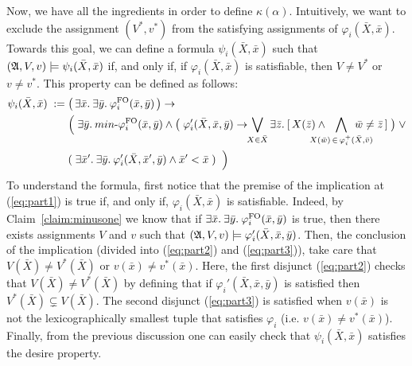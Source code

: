 Now, we have all the ingredients in order to define $\kappa(\alpha)$. 
Intuitively, we want to exclude the assignment $(V^*, v^*)$ from the satisfying assignments of $\varphi_i(\bar{X},\bar{x})$.
Towards this goal, we can define a formula $\psi_i(\bar{X},\bar{x})$ such that $(\mathfrak{A}, V, v) \models \psi_i(\bar{X},\bar{x})$ if, and only if, if $\varphi_i(\bar{X}, \bar{x})$ is satisfiable, then
$V \neq V^*$ or $v \neq v^*$. 
This property can be defined as follows:
\begin{align}
\psi_i(\bar{X},\bar{x}) \; := \;  &\big( \, \ex{\bar{x}} \ex{\bar{y}} \varphi^{\fo}_i(\bar{x},\bar{y}) \,\big) \rightarrow  \label{eq:part1} \\
&\Big( \; 
\ex{\bar{y}} \text{$min$-}\varphi^{\fo}_i(\bar{x}, \bar{y}) \wedge \big( \; \varphi_i'(\bar{X},\bar{x}, \bar{y})  \rightarrow \!\! \bigvee_{X \in \bar{X}} \ex{\bar{z}} [ \, X(\bar{z}) \wedge   \!\!\!\!\!\!\!\!\!\! \bigwedge\limits_{X(\bar{w}) \, \in \, \varphi^{+}_i(\bar{X},\bar{v})} \!\!\!\!\!\!\!\!\!\!\! \bar{w}\neq\bar{z} \, ] \; \big) \;  \vee   \label{eq:part2} \\ 
&(\; \ex{\bar{x}'} \ex{\bar{y}} \varphi_i'(\bar{X},\bar{x}',\bar{y})\wedge \bar{x}' < \bar{x} \; ) \;\; \Big)  \label{eq:part3}
\end{align}
To understand the formula, first notice that the premise of the implication at (\ref{eq:part1}) is true if, and only if, $\varphi_i(\bar{X}, \bar{x})$ is satisfiable. 
Indeed, by Claim~\ref{claim:minusone} we know that if $\exists{\bar{x}}.\: \exists{\bar{y}}.\: \varphi^{{\rm FO}}_i(\bar{x},\bar{y})$ is true, then there exists assignments $V$ and $v$ such that $(\mathfrak{A},V,v) \models\varphi_i'(\bar{X},\bar{x},\bar{y})$.
Then, the conclusion of the implication (divided into (\ref{eq:part2}) and (\ref{eq:part3})), take care that $V(\bar{X}) \neq V^*(\bar{X})$ or $v(\bar{x}) \neq v^*(\bar{x})$.
Here, the first disjunct (\ref{eq:part2}) checks that $V(\bar{X}) \neq V^*(\bar{X})$ by defining that if $\varphi_i'(\bar{X},\bar{x}, \bar{y})$ is satisfied then $V^*(\bar{X}) \subsetneq V(\bar{X})$. 
The second disjunct (\ref{eq:part3}) is satisfied when $v(\bar{x})$ is not the lexicographically smallest tuple that satisfies $\varphi_i$ (i.e. $v(\bar{x}) \neq v^*(\bar{x})$).
Finally, from the previous discussion one can easily check that $\psi_i(\bar{X},\bar{x})$ satisfies the desire property.

